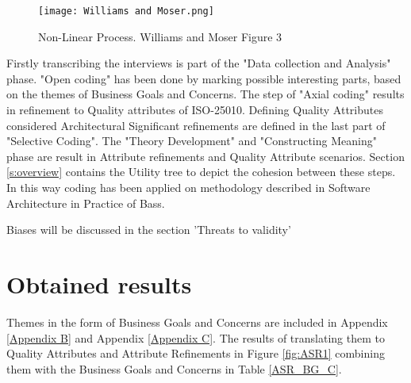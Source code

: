 \graphicspath{ {./images/} }
\begin{figure}
\centering
\label{fig:WM2019}
\texttt{[image: Williams and Moser.png]}\\
\caption{Non-Linear Process. Williams and Moser \cite{Williams2019TheAO} Figure 3}
\end{figure}

Firstly transcribing the interviews is part of the "Data collection and Analysis" phase. "Open coding" has been done by marking possible interesting parts, based on the themes of Business Goals and Concerns. The step of "Axial coding" results in refinement to Quality attributes of ISO-25010. Defining Quality Attributes considered Architectural Significant refinements are defined in the last part of "Selective Coding". The "Theory Development" and "Constructing Meaning" phase are result in Attribute refinements and Quality Attribute scenarios. Section \ref{s:overview} contains the Utility tree to depict the cohesion between these steps. In this way coding has been applied on methodology described in Software Architecture in Practice of Bass\etal \cite{Bass2015SoftwareAI}.

Biases will be discussed in the section 'Threats to validity'

\section{Obtained results}
Themes in the form of Business Goals and Concerns are included in Appendix \ref{Appendix B} and Appendix \ref{Appendix C}. The results of translating them to Quality Attributes and Attribute Refinements in Figure \ref{fig:ASR1} combining them with the Business Goals and Concerns in Table \ref{ASR_BG_C}.





